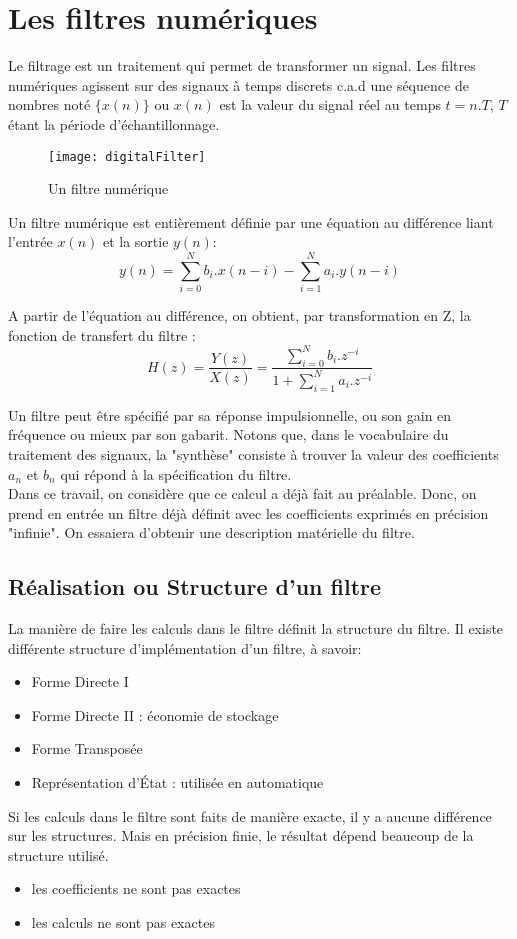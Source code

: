 \chapter{Les filtres numériques}

Le filtrage est un traitement qui permet de transformer  un signal. Les filtres numériques agissent sur des signaux à temps discrets c.a.d une séquence de nombres noté $\{x(n)\}$ ou $x(n)$ est la valeur du signal réel au temps $t = n.T$, $T$ étant la période d'échantillonnage.


\begin{figure}[h]
\centering
\texttt{[image: digitalFilter]}
\caption{Un filtre numérique}
\end{figure}

\bigskip
Un filtre numérique est entièrement définie par une équation au différence liant l'entrée $x(n)$ et la sortie $y(n)$:
\begin{equation}
y(n) = \sum_{i=0}^{N} b_{i}.x(n-i) - \sum_{i=1}^{N} a_{i}.y(n-i)
\end{equation}

\bigskip
A partir de l'équation au différence, on obtient, par transformation en Z, la fonction de transfert du filtre :
\begin{equation}
H(z) = \frac{Y(z)}{X(z)} = \frac{\sum_{i=0}^{N} b_{i}.z^{-i}}{1+\sum_{i=1}^{N} a_{i}.z^{-i}}
\end{equation}

\bigskip
Un filtre peut être spécifié par sa réponse impulsionnelle, ou son gain en fréquence ou mieux par son gabarit. 
Notons que, dans le vocabulaire du traitement des signaux, la "synthèse" consiste à trouver la valeur des coefficients $a_{n}$ et $b_{n}$ qui répond à la spécification du filtre. \\
Dans ce travail, on considère que ce calcul a déjà fait au préalable. Donc, on prend en entrée un filtre déjà définit avec les coefficients exprimés en précision "infinie". On essaiera d'obtenir une description matérielle du filtre. 


\section{Réalisation ou Structure d'un filtre}
La manière de faire les calculs dans le filtre définit la structure du filtre.
Il existe différente structure d'implémentation d'un filtre, à savoir:
\begin{itemize}
\item Forme Directe I
\item Forme Directe II : économie de stockage
\item Forme Transposée
\item Représentation d'État : utilisée en automatique
\end{itemize}
Si les calculs dans le filtre sont faits de manière exacte, il y a aucune différence sur les structures.
Mais en précision finie, le résultat dépend beaucoup de la structure utilisé.
\begin{itemize}
\item les coefficients ne sont pas exactes
\item les calculs ne sont pas exactes
\end{itemize}

